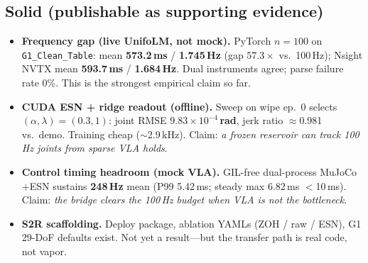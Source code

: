 \documentclass[conference]{IEEEtran}
\begin{document}
\subsection{Solid (publishable as supporting evidence)}
\begin{itemize}
    \item \textbf{Frequency gap (live UnifoLM, not mock).}
        PyTorch $n{=}100$ on \texttt{G1\_Clean\_Table}: mean \textbf{573.2\,ms} / \textbf{1.745\,Hz} (gap $57.3\times$ vs.\ 100\,Hz); Nsight NVTX mean \textbf{593.7\,ms} / \textbf{1.684\,Hz}.
        Dual instruments agree; parse failure rate 0\%. This is the strongest empirical claim so far.
    \item \textbf{CUDA ESN + ridge readout (offline).}
        Sweep on wipe ep.~0 selects $(\alpha,\lambda)=(0.3,1)$: joint RMSE \textbf{$9.83\times10^{-4}$\,rad}, jerk ratio $\approx$0.981 vs.\ demo.
        Training cheap ($\sim$2.9\,kHz). Claim: \emph{a frozen reservoir can track 100\,Hz joints from sparse VLA holds}.
    \item \textbf{Control timing headroom (mock VLA).}
        GIL-free dual-process MuJoCo$+$ESN sustains \textbf{248\,Hz} mean (P99 5.42\,ms; steady max 6.82\,ms $<$10\,ms).
        Claim: \emph{the bridge clears the 100\,Hz budget when VLA is not the bottleneck}.
    \item \textbf{S2R scaffolding.}
        Deploy package, ablation YAMLs (ZOH / raw / ESN), G1 29-DoF defaults exist. Not yet a result---but the transfer path is real code, not vapor.
\end{itemize}
\end{document}
